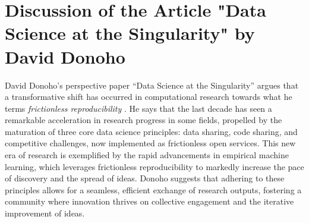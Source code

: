\documentclass[]{hdsr}
\begin{document}
\vspace{1cm}

\section*{Discussion of the Article "Data Science at the Singularity" by David Donoho}
\label{intro}
David Donoho's perspective paper ``Data Science at the Singularity'' argues that a transformative shift has occurred in computational research towards what he terms \emph{frictionless reproducibility} \citep{donoho2024data}. He says that the last decade has seen a remarkable acceleration in research progress in some fields, propelled by the maturation of three core data science principles: data sharing, code sharing, and competitive challenges, now implemented as frictionless open services. This new era of research is exemplified by the rapid advancements in empirical machine learning, which leverages frictionless reproducibility to markedly increase the pace of discovery and the spread of ideas. Donoho suggests that adhering to these principles allows for a seamless, efficient exchange of research outputs, fostering a community where innovation thrives on collective engagement and the iterative improvement of ideas.


\restoregeometry
{}
\end{document}
